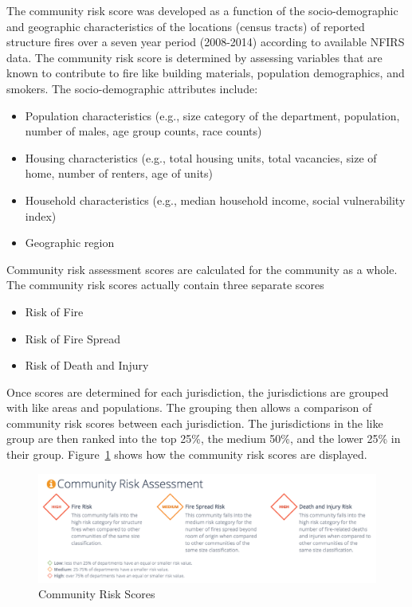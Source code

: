 \documentclass[12pt,oneside]{book}
\begin{document}
The community risk score was developed as a function of the socio-demographic and geographic characteristics of the locations (census tracts) of reported structure fires over a seven year period (2008-2014) according to available NFIRS data. The community risk score is determined by assessing variables that are known to contribute to fire like building materials, population demographics, and smokers. The socio-demographic attributes include:

\begin{itemize}
\item Population characteristics (e.g., size category of the department, population, number of males, age group counts, race counts)
\item Housing characteristics (e.g., total housing units, total vacancies, size of home, number of renters, age of units)
\item Household characteristics (e.g., median household income, social vulnerability index)
\item Geographic region
\end{itemize}

Community risk assessment scores are calculated for the community as a whole. The community risk scores actually contain three separate scores 

\begin{itemize}
\item Risk of Fire
\item Risk of Fire Spread
\item Risk of Death and Injury
\end{itemize}

Once scores are determined for each jurisdiction, the jurisdictions are grouped with like areas and populations.  The grouping then allows a comparison of community risk scores between each jurisdiction.  The jurisdictions in the like group are then ranked into the top 25\%, the medium 50\%, and the lower 25\% in their group. Figure~\ref{fig:risk} shows how the community risk scores are displayed.

\begin{figure}[ht!]
\centering
\includegraphics[width=.9\columnwidth]{Figures/risk}
\caption{Community Risk Scores}
\label{fig:risk}
\end{figure}
\end{document}
